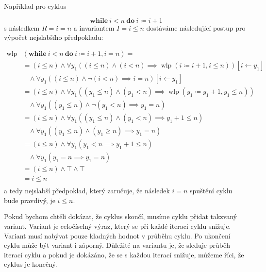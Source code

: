 Například pro cyklus

\begin{equation*}
    \textbf{while} \ i < n \ \textbf{do} \ i \coloneqq i + 1
\end{equation*}
s následkem $R = i = n$ a invariantem $I = i \leq n$ dostáváme následující postup pro výpočet nejslabšího předpokladu:

\begin{align*}
    \operatorname{wlp}&(\textbf{while} \ i < n \ \textbf{do} \ i \coloneqq i + 1, i = n) = \\
        & = (i \leq n) \land \forall y_1 \left( (i \leq n) \land (i < n) \implies \operatorname{wlp}(i \coloneqq i + 1, i \leq n) \right)[i \leftarrow y_1] \\
        & \ \ \ \ \land \forall y_1 \left( (i \leq n) \land \neg (i < n) \implies i = n \right)[i \leftarrow y_1] \\
        & = (i \leq n) \land \forall y_1 \left( (y_1 \leq n) \land (y_1 < n) \implies \operatorname{wlp}(y_1 \coloneqq y_1 + 1, y_1 \leq n) \right) \\
        & \ \ \ \ \land \forall y_1 \left( (y_1 \leq n) \land \neg (y_1 < n) \implies y_1 = n \right) \\
        & = (i \leq n) \land \forall y_1 \left( (y_1 \leq n) \land (y_1 < n) \implies y_1 + 1 \leq n \right) \\
        & \ \ \ \ \land \forall y_1 \left( (y_1 \leq n) \land (y_1 \geq n) \implies y_1 = n \right) \\
        & = (i \leq n) \land \forall y_1 \left( y_1 < n \implies y_1 + 1 \leq n \right) \\
        & \ \ \ \ \land \forall y_1 \left( y_1 = n \implies y_1 = n \right) \\
        & = (i \leq n) \land \top \land \top \\
        & = i \leq n \\
\end{align*}
a tedy nejslabší předpoklad, který zaručuje, že následek $i = n$ spuštění cyklu bude pravdivý, je $i \leq n$.

Pokud bychom chtěli dokázat, že cyklus skončí, musíme cyklu přidat takzvaný variant.
Variant je celočíselný výraz, který se při každé iteraci cyklu snižuje.
Variant musí nabývat pouze kladných hodnot v průběhu cyklu.
Po ukončení cyklu může být variant i záporný.
Důležité na variantu je, že sleduje průběh iterací cyklu a pokud
je dokázáno, že se s každou iterací snižuje, můžeme říci, že cyklus je konečný.

